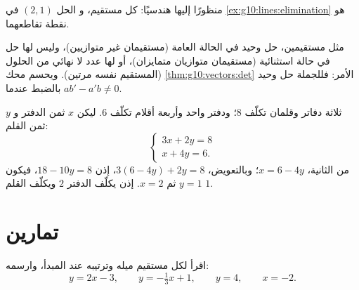 \begin{omfigure}

{\small {} منظورًا إليها هندسيًا: كل  مستقيم، و
الحل $(2,1)$ في \cref{ex:g10:lines:elimination} هو نقطة
تقاطعهما.}
\end{omfigure}

\begin{remark}[كم حلًّا؟]
مثل مستقيمين،  حل وحيد في الحالة العامة
(مستقيمان غير متوازيين)، وليس لها حل في حالة استثنائية (مستقيمان متوازيان متمايزان)، أو
لها عدد لا نهائي من الحلول (المستقيم نفسه مرتين). ويحسم محك
\cref{thm:g10:vectors:det} الأمر: فللجملة حل وحيد
بالضبط عندما $ab' - a'b \neq 0$.
\end{remark}

\begin{example}\label{ex:g10:lines:modeling}
ثلاثة دفاتر وقلمان تكلّف $8$؛ ودفتر واحد وأربعة أقلام تكلّف
$6$. ليكن $x$ ثمن الدفتر و $y$ ثمن القلم:
\[
\begin{cases}
3x + 2y = 8 \\
x + 4y = 6 .
\end{cases}
\]
من  الثانية، $x = 6 - 4y$؛ وبالتعويض،
$3(6 - 4y) + 2y = 8$، إذن $18 - 10y = 8$، فيكون $y = 1$ ثم
$x = 2$. إذن يكلّف الدفتر $2$ ويكلّف القلم $1$.
\end{example}

\section{تمارين}

\begin{exercise}[$\star$]\label{exo:g10:lines:1}
اقرأ لكل مستقيم ميله وترتيبه عند المبدأ، وارسمه:
\[
y = 2x - 3, \qquad
y = -\tfrac13 x + 1, \qquad
y = 4, \qquad
x = -2 .
\]
\end{exercise}

